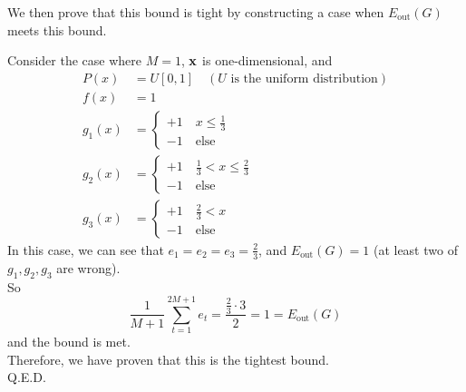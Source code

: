 \documentclass[11pt]{article}
\theoremstyle{definition}
\begin{document}
We then prove that this bound is tight by constructing a case when $E_\text{out}(G)$ meets this bound. \\ 
\par 
Consider the case where $M = 1$, $\vb{x}$ is one-dimensional, and
\begin{align*}
  P(x) &= U[0, 1]\quad(\text{$U$ is the uniform distribution}) \\ 
  f(x) &= 1 \\ 
  g_1(x) &= 
  \begin{cases}
    +1 \quad x \leq \frac{1}{3} \\
    -1 \quad \text{else} 
  \end{cases} \\ 
  g_2(x) &= 
  \begin{cases}
    +1 \quad \frac{1}{3} < x \leq \frac{2}{3} \\
    -1 \quad \text{else} 
  \end{cases} \\
  g_3(x) &= 
  \begin{cases}
    +1 \quad \frac{2}{3} < x \\ 
    -1 \quad \text{else} 
  \end{cases}
\end{align*}
\newpage
In this case, we can see that $e_1 = e_2 = e_3 = \frac{2}{3}$, and $E_\text{out}(G) = 1$ (at least two of $g_1, g_2, g_3$ are wrong). \\ 
So 
\[
  \frac{1}{M + 1}\sum^{2M + 1}_{t = 1}e_t = \frac{\frac{2}{3}\cdot 3}{2} = 1 = E_\text{out}(G)
\]
and the bound is met. \\ 
Therefore, we have proven that this is the tightest bound. \\ 
Q.E.D.
\newpage
\end{document}
